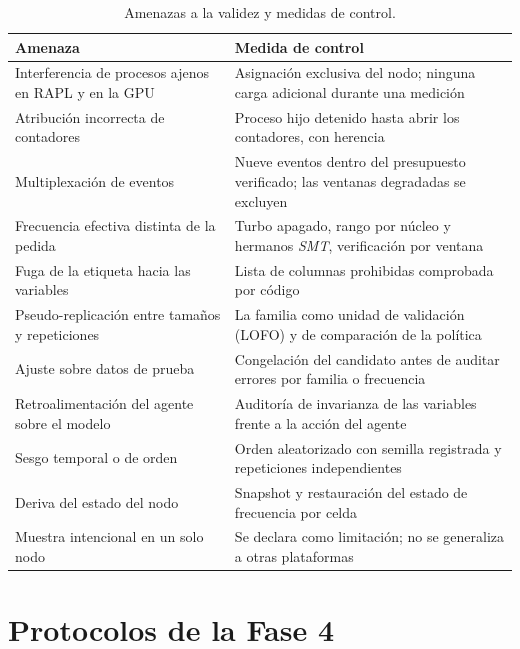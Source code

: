 \begin{table}[H]
\centering
\caption{Amenazas a la validez y medidas de control.}
\label{tab:met-amenazas}
\small
\begin{tabular}{@{}>{\raggedright\arraybackslash}p{4.6cm}>{\raggedright\arraybackslash}p{9.2cm}@{}}
\toprule
\textbf{Amenaza} & \textbf{Medida de control} \\
\midrule
Interferencia de procesos ajenos en RAPL y en la GPU & Asignación exclusiva del nodo; ninguna carga adicional durante una medición \\
Atribución incorrecta de contadores & Proceso hijo detenido hasta abrir los contadores, con herencia \\
Multiplexación de eventos & Nueve eventos dentro del presupuesto verificado; las ventanas degradadas se excluyen \\
Frecuencia efectiva distinta de la pedida & Turbo apagado, rango por núcleo y hermanos \textit{SMT}, verificación por ventana \\
Fuga de la etiqueta hacia las variables & Lista de columnas prohibidas comprobada por código \\
Pseudo-replicación entre tamaños y repeticiones & La familia como unidad de validación (LOFO) y de comparación de la política \\
Ajuste sobre datos de prueba & Congelación del candidato antes de auditar errores por familia o frecuencia \\
Retroalimentación del agente sobre el modelo & Auditoría de invarianza de las variables frente a la acción del agente \\
Sesgo temporal o de orden & Orden aleatorizado con semilla registrada y repeticiones independientes \\
Deriva del estado del nodo & Snapshot y restauración del estado de frecuencia por celda \\
Muestra intencional en un solo nodo & Se declara como limitación; no se generaliza a otras plataformas \\
\bottomrule
\end{tabular}
\end{table}

\section{Protocolos de la Fase 4}

